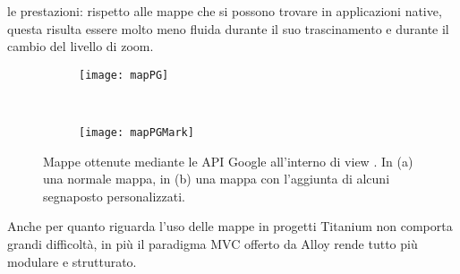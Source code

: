 			le prestazioni: rispetto alle mappe che si possono trovare in
			applicazioni native, questa risulta essere molto meno fluida durante
			il suo trascinamento e durante il cambio del livello di zoom.
			\begin{figure}[h]
				\centering
				\begin{subfigure}[b]{0.485\textwidth}
					\texttt{[image: mapPG]}
					\caption{}
					\label{fig:mapPG}
				\end{subfigure}
				~
				\begin{subfigure}[b]{0.485\textwidth}
					\texttt{[image: mapPGMark]}
					\caption{}
					\label{fig:mapPGMark}
				\end{subfigure}
				\caption{
					Mappe ottenute mediante le API Google all'interno di
					view \kendomob{}. In (a) una normale mappa, in
					(b) una mappa con l'aggiunta di alcuni
					segnaposto personalizzati.
				}
				\label{fig:PGMaps}
			\end{figure}
			
			Anche per quanto riguarda l'uso delle mappe in progetti Titanium
			non comporta grandi difficoltà, in più il paradigma MVC
			offerto da Alloy rende tutto più modulare e strutturato.
			


